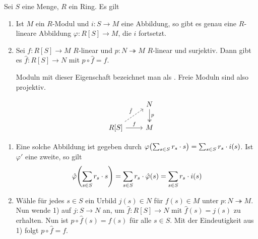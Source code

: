 \begin{lemma}[{name=[Universelle Eigenschaft von freien Moduln]},label=univ_frei_mod]
	Sei $S$ eine Menge, $R$ ein Ring. Es gilt\\
	\begin{minipage}[c]{0.7\textwidth}
		\begin{enumerate}[1)]
			\item Ist $M$ ein $R$-Modul und $i \colon S \to M$ eine Abbildung, so gibt es genau eine $R$-lineare Abbildung $\varphi \colon R[S] \to M$, die $i$ fortsetzt.
			\item Sei $f\colon R[S]\to M$ $R$-linear und $p\colon N\twoheadrightarrow M$ $R$-linear und surjektiv. Dann gibt es $\hat{f}\colon R[S]\to N$ mit $p\circ \hat{f}=f$.
		
			Moduln mit dieser Eigenschaft bezeichnet man als . Freie Moduln sind also projektiv.
		\end{enumerate}
	\end{minipage}\hfill
	\begin{minipage}[c]{0.25\textwidth}
		\[
			\begin{tikzcd}
				\mbox{ } & N \dar["p", two heads] \\
				R[S] \rar["f"] \urar["\hat{f}", dashed] & M
			\end{tikzcd}
		\]
	\end{minipage}
\end{lemma}
\begin{beweis}
	\leavevmode
	\begin{enumerate}[1)]
		\item Eine solche Abbildung ist gegeben durch
		\(
			\varphi \enbrace*{\sum_{s \in S} r_s \cdot s} = \sum_{s \in S} r_s \cdot i(s)
		\).
		Ist $\varphi'$ eine zweite, so gilt 
		\begin{align*}
			\hat{\varphi} \enbrace*{\sum_{s \in S} r_s \cdot s}  = \sum_{s \in S} r_s \cdot \hat{\varphi}(s) = \sum_{s  \in S} r_s \cdot i(s)
		\end{align*}
		\item Wähle für jedes $s \in S$ ein Urbild $j(s)\in N$ für $f(s) \in M$ unter $p\colon N \twoheadrightarrow M$. 
		Nun wende 1) auf $j \colon S \to N$ an, um $\hat{f} \colon R[S] \to N$ mit $\hat{f}(s) = j(s)$ zu erhalten. 
		Nun ist $ p \circ \hat{f}(s) = f(s)$ für alle $s \in S$. 
		Mit der Eindeutigkeit aus 1) folgt $p \circ \hat{f} = f$.\qedhere
	\end{enumerate}
\end{beweis}


